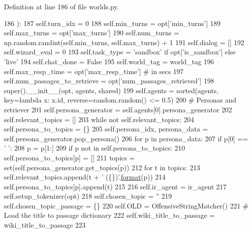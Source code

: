Definition at line 186 of file worlds.\+py.


\begin{DoxyCode}
186     ):
187         self.turn\_idx = 0
188         self.min\_turns = opt[\textcolor{stringliteral}{'min\_turns'}]
189         self.max\_turns = opt[\textcolor{stringliteral}{'max\_turns'}]
190         self.num\_turns = np.random.randint(self.min\_turns, self.max\_turns) + 1
191         self.dialog = []
192         self.wizard\_eval = 0
193         self.task\_type = \textcolor{stringliteral}{'sandbox'} \textcolor{keywordflow}{if} opt[\textcolor{stringliteral}{'is\_sandbox'}] \textcolor{keywordflow}{else} \textcolor{stringliteral}{'live'}
194         self.chat\_done = \textcolor{keyword}{False}
195         self.world\_tag = world\_tag
196         self.max\_resp\_time = opt[\textcolor{stringliteral}{'max\_resp\_time'}]  \textcolor{comment}{# in secs}
197         self.num\_passages\_to\_retrieve = opt[\textcolor{stringliteral}{'num\_passages\_retrieved'}]
198         super().\_\_init\_\_(opt, agents, shared)
199         self.agents = sorted(agents, key=\textcolor{keyword}{lambda} x: x.id, reverse=random.random() <= 0.5)
200         \textcolor{comment}{#  Personas and retriever}
201         self.persona\_generator = self.agents[0].persona\_generator
202         self.relevant\_topics = []
203         \textcolor{keywordflow}{while} \textcolor{keywordflow}{not} self.relevant\_topics:
204             self.persona\_to\_topics = \{\}
205             self.persona\_idx, persona\_data = self.persona\_generator.pop\_persona()
206             \textcolor{keywordflow}{for} p \textcolor{keywordflow}{in} persona\_data:
207                 \textcolor{keywordflow}{if} p[0] == \textcolor{stringliteral}{' '}:
208                     p = p[1:]
209                 \textcolor{keywordflow}{if} p \textcolor{keywordflow}{not} \textcolor{keywordflow}{in} self.persona\_to\_topics:
210                     self.persona\_to\_topics[p] = []
211                     topics = set(self.persona\_generator.get\_topics(p))
212                     \textcolor{keywordflow}{for} t \textcolor{keywordflow}{in} topics:
213                         self.relevant\_topics.append(t + \textcolor{stringliteral}{' (\{\})'}.\hyperlink{namespaceparlai_1_1chat__service_1_1services_1_1messenger_1_1shared__utils_a32e2e2022b824fbaf80c747160b52a76}{format}(p))
214                         self.persona\_to\_topics[p].append(t)
215 
216         self.ir\_agent = ir\_agent
217         self.setup\_tokenizer(opt)
218         self.chosen\_topic = \textcolor{stringliteral}{''}
219         self.chosen\_topic\_passage = \{\}
220         self.OLD = OffensiveStringMatcher()
221         \textcolor{comment}{# Load the title to passage dictionary}
222         self.wiki\_title\_to\_passage = wiki\_title\_to\_passage
223 
\end{DoxyCode}


